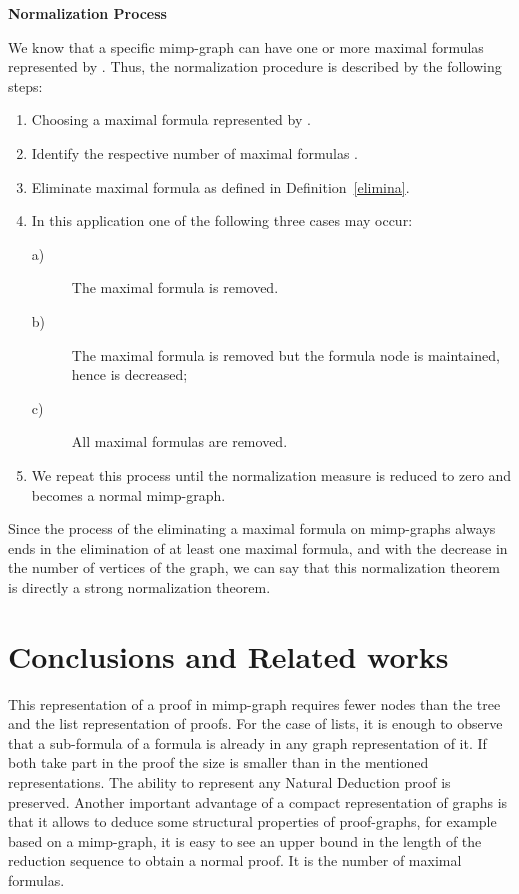 \documentclass[submission,copyright,creativecommons]{eptcs}
\begin{document}
\textbf{Normalization Process}

We know that a specific mimp-graph  can have one or more maximal formulas
represented by . Thus, the normalization procedure is
described by the following steps:

\begin{enumerate}
\item  Choosing a maximal formula represented by .

\item  Identify the respective number of maximal formulas .

\item  Eliminate maximal formula  as defined in Definition~\ref{elimina}.

\item  In this application one of the following three cases may occur:

\begin{description}
\item[a)]  The maximal formula is removed.
\item[b)]  The maximal formula is removed but the formula node is
maintained,  hence  is decreased;
\item[c)]  All maximal formulas are removed.
\end{description}

\item  We repeat this process until the normalization measure  is
reduced  to zero and  becomes a normal mimp-graph.
\end{enumerate}

Since the process of the eliminating a maximal formula on mimp-graphs always
ends in the elimination of at least one maximal formula, 
and with the decrease in the number of vertices of the graph, we can say that 
this normalization theorem is directly a strong normalization theorem. 

\section{Conclusions and Related works}

This representation of a proof in mimp-graph requires fewer nodes than the 
tree and the list representation of proofs. For the case of lists, it is enough to 
observe that a sub-formula of a formula is already in any graph representation of it. 
If both take part in the proof the size is smaller than in the mentioned 
representations. The ability to represent any Natural Deduction proof is preserved.
Another important advantage of a compact representation of graphs is that it 
allows to deduce some structural properties of proof-graphs, for example based on 
a mimp-graph, it is easy to see an upper bound in the length of the reduction sequence 
to obtain a normal proof. It is the number of maximal formulas.
\end{document}
